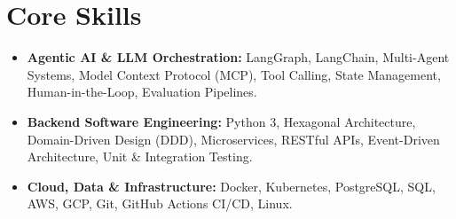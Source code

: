 \documentclass[a4paper,10pt]{article}
\begin{document}
\section{Core Skills}
\begin{itemize}
  \item \textbf{Agentic AI \& LLM Orchestration:} LangGraph, LangChain, Multi-Agent Systems, Model Context Protocol (MCP), Tool Calling, State Management, Human-in-the-Loop, Evaluation Pipelines.
  \item \textbf{Backend Software Engineering:} Python 3, Hexagonal Architecture, Domain-Driven Design (DDD), Microservices, RESTful APIs, Event-Driven Architecture, Unit \& Integration Testing.
  \item \textbf{Cloud, Data \& Infrastructure:} Docker, Kubernetes, PostgreSQL, SQL, AWS, GCP, Git, GitHub Actions CI/CD, Linux.
\end{itemize}
\end{document}
